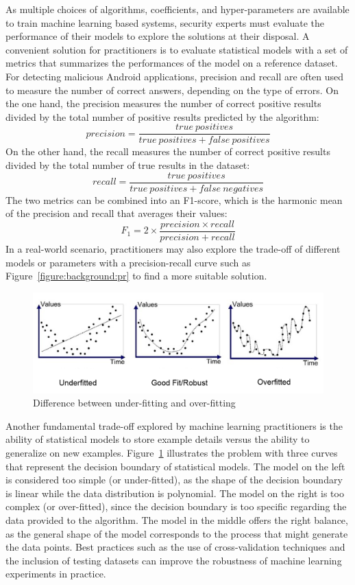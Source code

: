 As multiple choices of algorithms, coefficients, and hyper-parameters are available to train machine learning based systems, security experts must evaluate the performance of their models to explore the solutions at their disposal.
A convenient solution for practitioners is to evaluate statistical models with a set of metrics that summarizes the performances of the model on a reference dataset.
For detecting malicious Android applications, precision and recall are often used to measure the number of correct answers, depending on the type of errors.
On the one hand, the precision measures the number of correct positive results divided by the total number of positive results predicted by the algorithm:
$$precision = \frac{true\ positives}{true\ positives + false\ positives}$$
On the other hand, the recall measures the number of correct positive results divided by the total number of true results in the dataset:
$$recall = \frac{true\ positives}{true\ positives + false\ negatives}$$
The two metrics can be combined into an F1-score, which is the harmonic mean of the precision and recall that averages their values:
$$F_1 = 2 \times \frac{precision \times recall}{precision + recall}$$
In a real-world scenario, practitioners may also explore the trade-off of different models or parameters with a precision-recall curve such as Figure~\ref{figure:background:pr} to find a more suitable solution.

\begin{figure}[!ht]
        \centering
	\includegraphics[width=\linewidth]{figures/background/fit.png}
        \caption[Difference between under-fitting and over-fitting]{Difference between under-fitting and over-fitting~\cite{bhande_what_2018}}
	\label{figure:background:fit}
\end{figure}

Another fundamental trade-off explored by machine learning practitioners is the ability of statistical models to store example details versus the ability to generalize on new examples.
Figure~\ref{figure:background:fit} illustrates the problem with three curves that represent the decision boundary of statistical models.
The model on the left is considered too simple (or under-fitted), as the shape of the decision boundary is linear while the data distribution is polynomial.
The model on the right is too complex (or over-fitted), since the decision boundary is too specific regarding the data provided to the algorithm.
The model in the middle offers the right balance, as the general shape of the model corresponds to the process that might generate the data points.
Best practices such as the use of cross-validation techniques and the inclusion of testing datasets can improve the robustness of machine learning experiments in practice.

